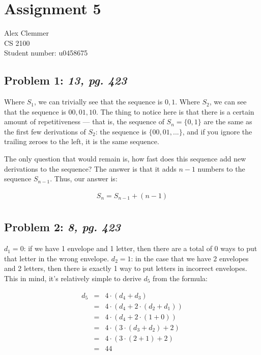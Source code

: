 \documentclass[a4paper]{article}
\begin{document}
\section*{Assignment 5}
Alex Clemmer\\
CS 2100 \\
Student number: u0458675

\subsection*{Problem 1: \textit{13, pg. 423}} 

Where $S_1$, we can trivially see that the sequence is $0, 1$. Where $S_2$, we can see that the sequence is $00, 01, 10$. The thing to notice here is that there is a certain amount of repetitiveness --- that is, the sequence of $S_n = \{0, 1\}$ are the same as the first few derivations of $S_2$: the sequence is $\{00, 01, ...\}$, and if you ignore the trailing zeroes to the left, it is the same sequence.

The only question that would remain is, how fast does this sequence add new derivations to the sequence? The answer is that it adds $n-1$ numbers to the sequence $S_{n-1}$. Thus, our answer is:

\begin{equation}
\begin{array}{rll}
S_n = S_{n-1} + (n-1) \\[.0in]
\end{array}
\end{equation}

\subsection*{Problem 2: \textit{8, pg. 423}} 

$d_1 = 0$: if we have 1 envelope and 1 letter, then there are a total of 0 ways to put that letter in the wrong envelope. $d_2 = 1$: in the case that we have 2 envelopes and 2 letters, then there is exactly 1 way to put letters in incorrect envelopes. This in mind, it's relatively simple to derive $d_5$ from the formula:

\begin{equation}
\begin{array}{rcl}
d_5 & = & 4 \cdot (d_{4} + d_{3}) \\[.08in]
& = & 4 \cdot(d_4 + 2 \cdot (d_2 + d_1)) \\[.08in]
& = & 4 \cdot(d_4 + 2 \cdot (1 + 0)) \\[.08in]
& = & 4 \cdot(3 \cdot (d_3 + d_2) + 2) \\[.08in]
& = & 4 \cdot(3 \cdot (2 + 1) + 2) \\[.08in]
& = & 44 \\[.08in]
\end{array}
\end{equation}
\end{document}
